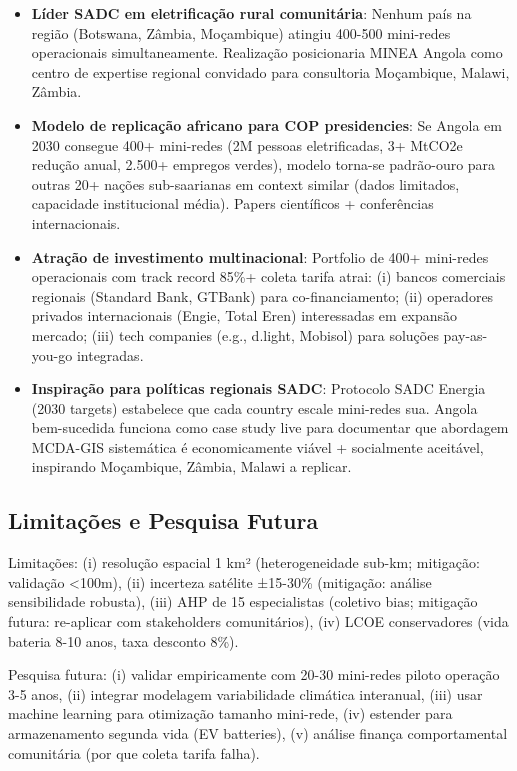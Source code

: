 \documentclass[12pt, a4paper]{article}
\begin{document}
\begin{itemize}
\item \textbf{Líder SADC em eletrificação rural comunitária}: Nenhum país na região (Botswana, Zâmbia, Moçambique) atingiu 400-500 mini-redes operacionais simultaneamente. Realização posicionaria MINEA Angola como centro de expertise regional convidado para consultoria Moçambique, Malawi, Zâmbia.

\item \textbf{Modelo de replicação africano para COP presidencies}: Se Angola em 2030 consegue 400+ mini-redes (2M pessoas eletrificadas, 3+ MtCO2e redução anual, 2.500+ empregos verdes), modelo torna-se padrão-ouro para outras 20+ nações sub-saarianas em context similar (dados limitados, capacidade institucional média). Papers científicos + conferências internacionais.

\item \textbf{Atração de investimento multinacional}: Portfolio de 400+ mini-redes operacionais com track record 85\%+ coleta tarifa atrai: (i) bancos comerciais regionais (Standard Bank, GTBank) para co-financiamento; (ii) operadores privados internacionais (Engie, Total Eren) interessadas em expansão mercado; (iii) tech companies (e.g., d.light, Mobisol) para soluções pay-as-you-go integradas.

\item \textbf{Inspiração para políticas regionais SADC}: Protocolo SADC Energia (2030 targets) estabelece que cada country escale mini-redes sua. Angola bem-sucedida funciona como case study live para documentar que abordagem MCDA-GIS sistemática é economicamente viável + socialmente aceitável, inspirando Moçambique, Zâmbia, Malawi a replicar.
\end{itemize}

\subsection{Limitações e Pesquisa Futura}

Limitações: (i) resolução espacial 1 km² (heterogeneidade sub-km; mitigação: validação <100m), (ii) incerteza satélite ±15-30\% (mitigação: análise sensibilidade robusta), (iii) AHP de 15 especialistas (coletivo bias; mitigação futura: re-aplicar com stakeholders comunitários), (iv) LCOE conservadores (vida bateria 8-10 anos, taxa desconto 8\%).

Pesquisa futura: (i) validar empiricamente com 20-30 mini-redes piloto operação 3-5 anos, (ii) integrar modelagem variabilidade climática interanual, (iii) usar machine learning para otimização tamanho mini-rede, (iv) estender para armazenamento segunda vida (EV batteries), (v) análise finança comportamental comunitária (por que coleta tarifa falha).
\end{document}
